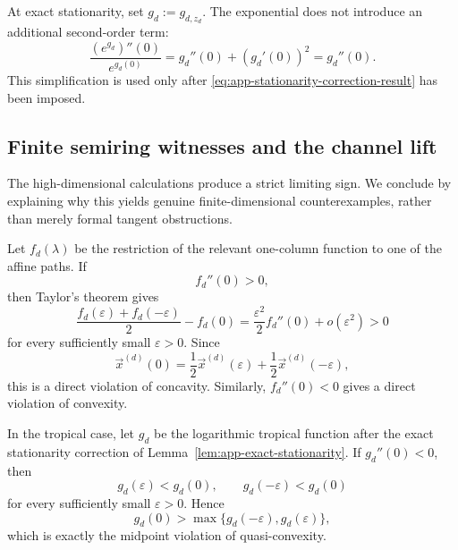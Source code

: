 \documentclass[aps,pra,11pt,onecolumn,nofootinbib,tightenlines]{revtex4-2}
\theoremstyle{definition}
\begin{document}
At exact stationarity, set $g_d:=g_{d,z_d}$.  The exponential does not
introduce an additional second-order term:
\begin{equation}
 \frac{(e^{g_d})''(0)}{e^{g_d(0)}}
 =g_d''(0)+(g_d'(0))^2
 =g_d''(0).
 \label{eq:app-exponential-at-stationarity}
\end{equation}
This simplification is used only after \eqref{eq:app-stationarity-correction-result} has been imposed.

\subsection{Finite semiring witnesses and the channel lift}
\label{app:finite-counterexamples}

The high-dimensional calculations produce a strict limiting sign.  We conclude by explaining why this yields genuine finite-dimensional counterexamples, rather than merely formal tangent obstructions.

Let $f_d(\lambda)$ be the restriction of the relevant one-column function to one of the affine paths.  If
\begin{equation}
 f_d''(0)>0,
 \label{eq:app-positive-second}
\end{equation}
then Taylor's theorem gives
\begin{equation}
 \frac{f_d(\varepsilon)+f_d(-\varepsilon)}2-f_d(0)
 =\frac{\varepsilon^2}{2}f_d''(0)+o(\varepsilon^2)>0
 \label{eq:app-concavity-endpoints}
\end{equation}
for every sufficiently small $\varepsilon>0$.  Since
\begin{equation}
 \vec x^{(d)}(0)
 =\frac12\vec x^{(d)}(\varepsilon)
 +\frac12\vec x^{(d)}(-\varepsilon),
 \label{eq:app-affine-midpoint}
\end{equation}
this is a direct violation of concavity.  Similarly, $f_d''(0)<0$ gives a direct violation of convexity.

In the tropical case, let $g_d$ be the logarithmic tropical function after the exact stationarity correction of Lemma~\ref{lem:app-exact-stationarity}.  If $g_d''(0)<0$, then
\begin{equation}
 g_d(\varepsilon)<g_d(0),
 \qquad
 g_d(-\varepsilon)<g_d(0)
 \label{eq:app-tropical-endpoint-values}
\end{equation}
for every sufficiently small $\varepsilon>0$.  Hence
\begin{equation}
 g_d(0)>
 \max\{g_d(-\varepsilon),g_d(\varepsilon)\},
 \label{eq:app-tropical-midpoint-violation}
\end{equation}
which is exactly the midpoint violation of quasi-convexity.
\end{document}
